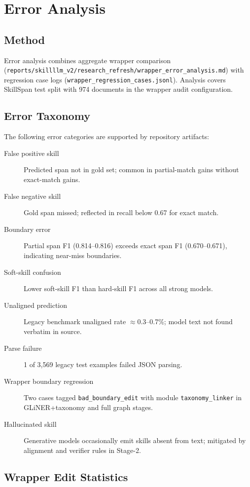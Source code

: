 \chapter{Error Analysis}
\label{ch:error}

\section{Method}

Error analysis combines aggregate wrapper comparison (\texttt{reports/skillllm\_v2/research\_refresh/wrapper\_error\_analysis.md}) with regression case logs (\texttt{wrapper\_regression\_cases.jsonl}).
Analysis covers SkillSpan test split with 974 documents in the wrapper audit configuration.

\section{Error Taxonomy}

The following error categories are supported by repository artifacts:

\begin{description}
  \item[False positive skill] Predicted span not in gold set; common in partial-match gains without exact-match gains.
  \item[False negative skill] Gold span missed; reflected in recall below 0.67 for exact match.
  \item[Boundary error] Partial span F1 (0.814--0.816) exceeds exact span F1 (0.670--0.671), indicating near-miss boundaries.
  \item[Soft-skill confusion] Lower soft-skill F1 than hard-skill F1 across all strong models.
  \item[Unaligned prediction] Legacy benchmark unaligned rate $\approx$0.3--0.7\%; model text not found verbatim in source.
  \item[Parse failure] 1 of 3{,}569 legacy test examples failed JSON parsing.
  \item[Wrapper boundary regression] Two cases tagged \texttt{bad\_boundary\_edit} with module \texttt{taxonomy\_linker} in GLiNER+taxonomy and full graph stages.
  \item[Hallucinated skill] Generative models occasionally emit skills absent from text; mitigated by alignment and verifier rules in Stage-2.
\end{description}

\section{Wrapper Edit Statistics}

